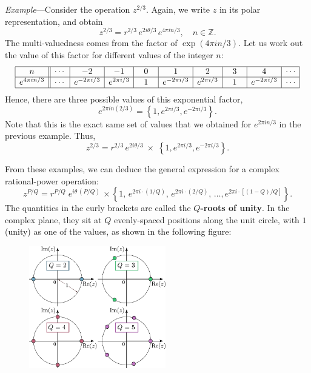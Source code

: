 \documentclass[10pt,a4paper]{article}
\begin{document}
\begin{framed} \noindent
  \textit{Example}---Consider the operation $z^{2/3}$. Again, we write
  $z$ in its polar representation, and obtain
\begin{equation}
z^{2/3} = r^{2/3} \, e^{2i\theta/3} \, e^{4\pi i n/3}, \quad n \in \mathbb{Z}.
\end{equation}
The multi-valuedness comes from the factor of $\exp(4\pi i n/3)$. Let
us work out the value of this factor for different values of the integer
$n$:
\begin{equation*}
\begin{array}{|c||c|c|c|c|c|c|c|c|c|} \hline n &\cdots & -2 & -1 & 0 & 1 & 2 & 3 & 4 & \cdots \\ \hline e^{4\pi i n/3} &\cdots & e^{-2\pi i /3} & e^{2\pi i /3} & \;\,\;1\;\,\; & e^{-2\pi i /3} & e^{2\pi i /3} & \;\,\;1\;\,\; & e^{-2\pi i /3} & \cdots \\ \hline \end{array}
\end{equation*}
Hence, there are three possible values of this exponential factor,
\begin{equation}
e^{2\pi i n (2/3)} = \left\{1, e^{2\pi i /3}, e^{-2\pi i /3}\right\}.
\end{equation}
Note that this is the exact same set of values that we obtained for
$e^{2\pi i n/3}$ in the previous example. Thus,
\begin{equation}
z^{2/3} = r^{2/3} \, e^{2i\theta/3} \;\times\; \left\{1, e^{2\pi i /3}, e^{-2\pi i /3}\right\}.
\end{equation}
\end{framed}

\pagebreak
From these examples, we can deduce the general expression for a complex
rational-power operation:
\begin{equation}
z^{P/Q} = r^{P/Q} \; e^{i\theta\, (P/Q)}\, \times \left\{1,\, e^{2\pi i \cdot (1/Q)},\, e^{2\pi i \cdot (2/Q)},\, \dots, e^{2\pi i \cdot [(1-Q)/Q]} \right\}.
\end{equation}
The quantities in the curly brackets are called the \textbf{$Q$-roots
  of unity}. In the complex plane, they sit at $Q$ evenly-spaced
positions along the unit circle, with $1$ (unity) as one of the
values, as shown in the following figure:

\begin{figure}[h]
  \centering\includegraphics[width=0.53\textwidth]{roots_of_unity}
\end{figure}
\end{document}
